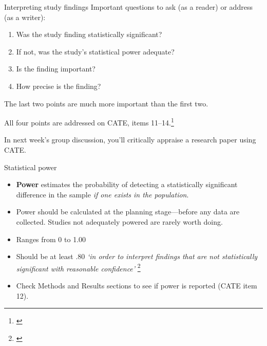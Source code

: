 \documentclass{beamer}
\begin{document}
% 
\begin{frame}{Interpreting study findings}
Important questions to ask (as a reader) or address (as a writer):
	\begin{enumerate}
	\item Was the study finding statistically significant?
	\item If not, was the study's statistical power adequate?
	\item Is the finding important?
	\item How precise is the finding?
	\end{enumerate} 
The last two points are much more important than the first two.
\vspace{3mm}

All four points are addressed on CATE, items 11--14.\footnote{\tiny{\citep[p. 67]{Dollaghan2007}}}  

\vspace{3mm}

\normalsize{In next week's group discussion, you'll critically appraise a research paper using CATE.}
\end{frame} 

% 
\begin{frame}{Statistical power}
	\begin{itemize}
	\item \textbf{Power} estimates the probability of detecting a statistically significant difference in the \alert{sample} \emph{if one exists in the \alert{population}}.
	\item Power should be calculated at the planning stage---\alert{before} any data are collected. Studies not adequately powered are rarely worth doing. 
	\item Ranges from 0 to 1.00
	\item Should be at least .80 \emph{`in order to interpret findings that are not statistically significant with reasonable confidence'} \footnote{\tiny{\citet[p. 38]{Dollaghan2007}}} 
	\item Check Methods and Results sections to see if power is reported (CATE item 12).
	\end{itemize}
\end{frame}
\end{document}
